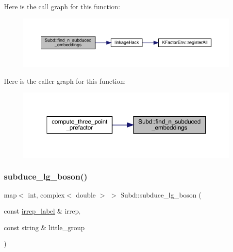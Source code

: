 Here is the call graph for this function\+:\nopagebreak
\begin{figure}[H]
\begin{center}
\leavevmode
\includegraphics[width=350pt]{d8/d2b/namespaceSubd_a7a3fcd97f1cf40eb963e278240d0ff3e_cgraph}
\end{center}
\end{figure}
Here is the caller graph for this function\+:\nopagebreak
\begin{figure}[H]
\begin{center}
\leavevmode
\includegraphics[width=347pt]{d8/d2b/namespaceSubd_a7a3fcd97f1cf40eb963e278240d0ff3e_icgraph}
\end{center}
\end{figure}
\mbox{\label{namespaceSubd_a5f31b3ef70ad25320a8010ec3017eb04}} 
\subsubsection{\texorpdfstring{subduce\_lg\_boson()}{subduce\_lg\_boson()}}
{\footnotesize\ttfamily map$<$ int, complex$<$ double $>$ $>$ Subd\+::subduce\+\_\+lg\+\_\+boson (\begin{DoxyParamCaption}\item[{const \mbox{\hyperlink{structirrep__label}{irrep\+\_\+label}} \&}]{irrep,  }\item[{const string \&}]{little\+\_\+group }\end{DoxyParamCaption})}

